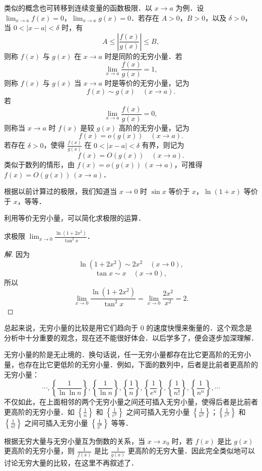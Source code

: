 类似的概念也可转移到连续变量的函数极限．以 $x \to a$ 为例．设 $\lim_{x \to a} f(x) = 0$，$\lim_{x \to a} g(x) = 0$．若存在 $A > 0$，$B > 0$，以及 $\delta > 0$，当 $0 < |x - a| < \delta$ 时，有
\[
A \leqslant \left|\frac{f(x)}{g(x)}\right| \leqslant B,
\]
则称 $f(x)$ 与 $g(x)$ 在 $x \to a$ 时是同阶的无穷小量．若
\[
\lim_{x \to a} \frac{f(x)}{g(x)} = 1,
\]
则称 $f(x)$ 与 $g(x)$ 当 $x \to a$ 时是等价的无穷小量，记为
\[
f(x) \sim g(x) \quad (x \to a).
\]
若
\[
\lim_{x \to a} \frac{f(x)}{g(x)} = 0,
\]
则称当 $x \to a$ 时 $f(x)$ 是较 $g(x)$ 高阶的无穷小量，记为
\[
f(x) = o(g(x)) \quad (x \to a).
\]
若存在 $\delta > 0$，使得 $\frac{f(x)}{g(x)}$ 在 $0 < |x - a| < \delta$ 有界，则记为
\[
f(x) = O(g(x)) \quad (x \to a).
\]
类似于数列的情形，由 $f(x) = o(g(x)) \ (x \to a)$，可推得 $f(x) = O(g(x)) \ (x \to a)$．

根据以前计算过的极限，我们知道当 $x \to 0$ 时 $\sin x$ 等价于 $x$，$\ln(1+x)$ 等价于 $x$，等等．

利用等价无穷小量，可以简化求极限的运算．

\begin{example}\label{ex:3-5-5}
求极限 $\lim_{x \to 0} \frac{\ln(1+2x^2)}{\tan^2 x}$．
\end{example}

\begin{proof}[解]
因为
\[
\ln(1+2x^2) \sim 2x^2 \quad (x \to 0),
\]
\[
\tan x \sim x \quad (x \to 0),
\]
所以
\[
\lim_{x \to 0} \frac{\ln(1+2x^2)}{\tan^2 x} = \lim_{x \to 0} \frac{2x^2}{x^2} = 2.
\]
\end{proof}

总起来说，无穷小量的比较是用它们趋向于 $0$ 的速度快慢来衡量的．这个观念是分析中十分重要的观念，现在还不能很好体会．以后学多了，便会逐步加深理解．

无穷小量的阶是无止境的．换句话说，任一无穷小量都存在比它更高阶的无穷小量，也存在比它更低阶的无穷小量．例如，下面的数列中，后者是比前者更高阶的无穷小量：
\[
\cdots, \left\{\frac{1}{\ln\ln n}\right\}, \left\{\frac{1}{\ln n}\right\}, \left\{\frac{1}{n}\right\}, \left\{\frac{1}{e^n}\right\}, \left\{\frac{1}{n!}\right\}, \left\{\frac{1}{n^n}\right\}, \cdots
\]
不仅如此，在上面相邻的两个无穷小量之间还可插入无穷小量，使得后者是比前者更高阶的无穷小量．如 $\left\{\frac{1}{n}\right\}$ 和 $\left\{\frac{1}{e^n}\right\}$ 之间可插入无穷小量 $\left\{\frac{1}{n^2}\right\}$；$\left\{\frac{1}{e^n}\right\}$ 和 $\left\{\frac{1}{n!}\right\}$ 之间可插入无穷小量 $\left\{\frac{1}{3^n}\right\}$ 等等．

根据无穷大量与无穷小量互为倒数的关系，当 $x \to x_0$ 时，若 $f(x)$ 是比 $g(x)$ 更高阶的无穷小量，则 $\frac{1}{f(x)}$ 是比 $\frac{1}{g(x)}$ 更高阶的无穷大量．因此完全类似地可以讨论无穷大量的比较，在这里不再叙述了．

